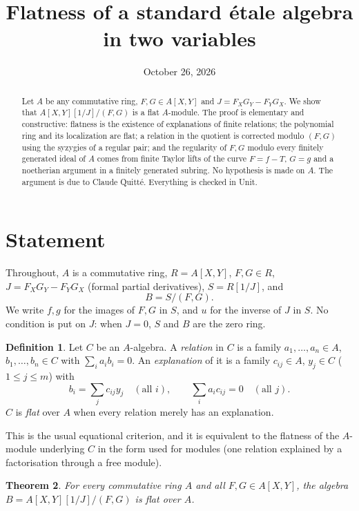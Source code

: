 \documentclass[11pt]{amsart}
\title{Flatness of a standard \'etale algebra in two variables}
\date{October 26, 2026}
\newtheorem{theorem}{Theorem}[section]
\theoremstyle{definition}
\newtheorem{definition}[theorem]{Definition}
\theoremstyle{remark}
\begin{document}
\begin{abstract}
Let $A$ be any commutative ring, $F,G\in A[X,Y]$ and $J=F_XG_Y-F_YG_X$.
We show that $A[X,Y][1/J]/(F,G)$ is a flat $A$-module. The proof is
elementary and constructive: flatness is the existence of explanations of
finite relations; the polynomial ring and its localization are flat; a
relation in the quotient is corrected modulo $(F,G)$ using the syzygies
of a regular pair; and the regularity of $F,G$ modulo every finitely
generated ideal of $A$ comes from finite Taylor lifts of the curve
$F=f-T$, $G=g$ and a noetherian argument in a finitely generated subring.
No hypothesis is made on $A$. The argument is due to Claude Quitt\'e.
Everything is checked in Unit.
\end{abstract}
\maketitle

\section{Statement}

Throughout, $A$ is a commutative ring, $R=A[X,Y]$, $F,G\in R$,
$J=F_XG_Y-F_YG_X$ (formal partial derivatives), $S=R[1/J]$, and
\[
 B=S/(F,G).
\]
We write $f,g$ for the images of $F,G$ in $S$, and $u$ for the inverse of
$J$ in $S$. No condition is put on $J$: when $J=0$, $S$ and $B$ are the
zero ring.

\begin{definition}
Let $C$ be an $A$-algebra. A \emph{relation} in $C$ is a family
$a_1,\dots,a_n\in A$, $b_1,\dots,b_n\in C$ with $\sum_i a_ib_i=0$. An
\emph{explanation} of it is a family $c_{ij}\in A$, $y_j\in C$
($1\le j\le m$) with
\[
 b_i=\sum_j c_{ij}y_j\quad(\text{all }i),\qquad
 \sum_i a_ic_{ij}=0\quad(\text{all }j).
\]
$C$ is \emph{flat} over $A$ when every relation merely has an explanation.
\end{definition}

This is the usual equational criterion, and it is equivalent to the
flatness of the $A$-module underlying $C$ in the form used for modules
(one relation explained by a factorisation through a free module).

\begin{theorem}\label{thm:main}
For every commutative ring $A$ and all $F,G\in A[X,Y]$, the algebra
$B=A[X,Y][1/J]/(F,G)$ is flat over $A$.
\end{theorem}
\end{document}

